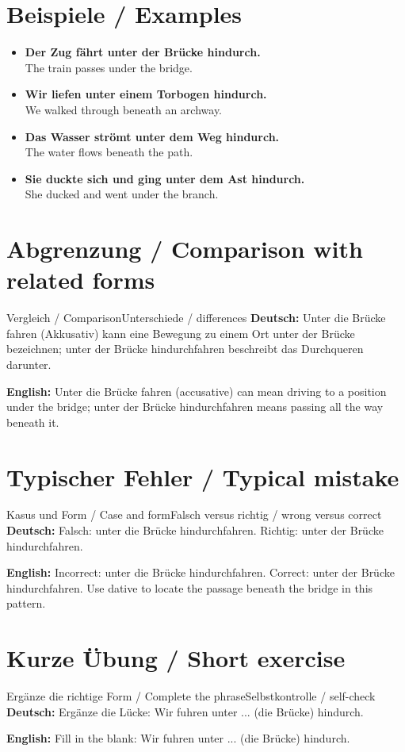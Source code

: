 \documentclass[a4paper,11pt]{article}
\newcommand{\GermanText}[1]{\textbf{Deutsch: }#1\par}
\newcommand{\EnglishText}[1]{{\small\color{SoftGray}\textbf{English: }#1\par}}
\newcommand{\ExampleItem}[2]{\item \textbf{#1}\\{\small\color{SoftGray}#2}}
\begin{document}
\section{Beispiele / Examples}
\begin{exbox}
\begin{itemize}
\ExampleItem{Der Zug fährt unter der Brücke hindurch.}{The train passes under the bridge.}
\ExampleItem{Wir liefen unter einem Torbogen hindurch.}{We walked through beneath an archway.}
\ExampleItem{Das Wasser strömt unter dem Weg hindurch.}{The water flows beneath the path.}
\ExampleItem{Sie duckte sich und ging unter dem Ast hindurch.}{She ducked and went under the branch.}
\end{itemize}
\end{exbox}
\section{Abgrenzung / Comparison with related forms}
\begin{grammarentry}{Vergleich / Comparison}{Unterschiede / differences}
\GermanText{Unter die Brücke fahren (Akkusativ) kann eine Bewegung zu einem Ort unter der Brücke bezeichnen; unter der Brücke hindurchfahren beschreibt das Durchqueren darunter.}
\EnglishText{Unter die Brücke fahren (accusative) can mean driving to a position under the bridge; unter der Brücke hindurchfahren means passing all the way beneath it.}
\end{grammarentry}
\section{Typischer Fehler / Typical mistake}
\begin{grammarentry}{Kasus und Form / Case and form}{Falsch versus richtig / wrong versus correct}
\GermanText{Falsch: unter die Brücke hindurchfahren. Richtig: unter der Brücke hindurchfahren.}
\EnglishText{Incorrect: unter die Brücke hindurchfahren. Correct: unter der Brücke hindurchfahren. Use dative to locate the passage beneath the bridge in this pattern.}
\end{grammarentry}
\section{Kurze Übung / Short exercise}
\begin{grammarentry}{Ergänze die richtige Form / Complete the phrase}{Selbstkontrolle / self-check}
\GermanText{Ergänze die Lücke: Wir fuhren unter ... (die Brücke) hindurch.}
\EnglishText{Fill in the blank: Wir fuhren unter ... (die Brücke) hindurch.}
\end{grammarentry}
\end{document}

